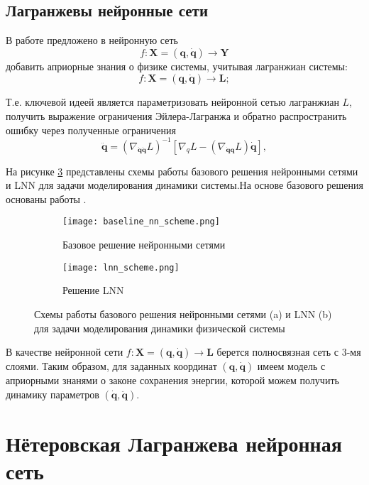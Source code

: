 \documentclass[12pt]{article}
\begin{document}
\subsection{Лагранжевы нейронные сети}

В работе \cite{Cranmer2020LagrangianNN} предложено в нейронную сеть $$f: \mathbf{X} = (\mathbf{q}, \mathbf{\dot{q}}) \rightarrow \mathbf{Y}$$
 добавить априорные знания о физике системы, учитывая лагранжиан системы:
$$f: \mathbf{X} = (\mathbf{q}, \mathbf{\dot{q}}) \rightarrow \mathbf{L};$$

Т.е. ключевой идеей является параметризовать нейронной сетью лагранжиан $L$, получить выражение ограничения Эйлера-Лагранжа и обратно распространить ошибку через полученные ограничения
$$\ddot{\mathbf{q}} =\left(\nabla_{\dot{\mathbf{q}} \dot{\mathbf{q}}} L\right)^{-1}\left[\nabla_{q} L-\left(\nabla_{\dot{\mathbf{q}}\mathbf{q}} L\right) \dot{\mathbf{q}}\right],$$ 

На рисунке \ref{fig: base_vs_lnn} представлены схемы работы базового решения нейронными сетями и LNN для задачи моделирования динамики системы.На основе базового решения основаны работы \cite{NEURIPS2018_69386f6b, 712178}.

\begin{figure}[H]
	\centering
	\begin{subfigure}[b]{0.49\textwidth}
		\centering
		\texttt{[image: baseline\_nn\_scheme.png]}
		\caption{Базовое решение нейронными сетями}
		\label{fig:y equals x}
	\end{subfigure}
	\hfill
	\begin{subfigure}[b]{0.49\textwidth}
		\centering
		\texttt{[image: lnn\_scheme.png]}
		\caption{Решение LNN}
		\label{fig:three sin x}
	\end{subfigure}
\caption{Схемы работы базового решения нейронными сетями (a) и LNN (b) для задачи моделирования динамики физической системы}
\label{fig: base_vs_lnn}
\end{figure}

В качестве нейронной сети $f: \mathbf{X} = (\mathbf{q}, \mathbf{\dot{q}}) \rightarrow \mathbf{L}$ берется полносвязная сеть с 3-мя слоями. Таким образом, для заданных координат  $(\mathbf{q}, \mathbf{\dot{q}})$ имеем модель с априорными знанями о законе сохранения энергии, которой можем получить динамику параметров $(\mathbf{\dot{q}}, \mathbf{\ddot{q}})$.

\section{Нётеровская Лагранжева нейронная сеть}
\end{document}
